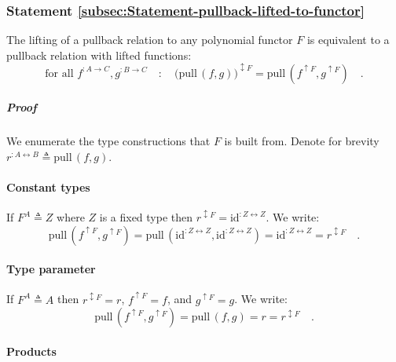 \subsubsection{Statement \label{subsec:Statement-pullback-lifted-to-functor}\ref{subsec:Statement-pullback-lifted-to-functor}}

The lifting of a pullback relation to any polynomial functor $F$
is equivalent to a pullback relation with lifted functions:
\[
\text{for all }f^{:A\rightarrow C},g^{:B\rightarrow C}\quad:\quad\big(\text{pull}\,(f,g)\big)^{\updownarrow F}=\text{pull}\,(f^{\uparrow F},g^{\uparrow F})\quad.
\]


\subparagraph{Proof}

We enumerate the type constructions that $F$ is built from. Denote
for brevity $r^{:A\leftrightarrow B}\triangleq\text{pull}\,(f,g)$.

\paragraph{Constant types}

If $F^{A}\triangleq Z$ where $Z$ is a fixed type then $r^{\updownarrow F}=\text{id}^{:Z\leftrightarrow Z}$.
We write:
\[
\text{pull}\,(f^{\uparrow F},g^{\uparrow F})=\text{pull}\,(\text{id}^{:Z\leftrightarrow Z},\text{id}^{:Z\leftrightarrow Z})=\text{id}^{:Z\leftrightarrow Z}=r^{\updownarrow F}\quad.
\]


\paragraph{Type parameter}

If $F^{A}\triangleq A$ then $r^{\updownarrow F}=r$, $f^{\uparrow F}=f$,
and $g^{\uparrow F}=g$. We write:
\[
\text{pull}\,(f^{\uparrow F},g^{\uparrow F})=\text{pull}\,(f,g)=r=r^{\updownarrow F}\quad.
\]


\paragraph{Products}


